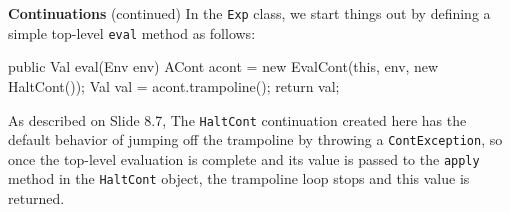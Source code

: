 \begin{minipage}[t]{\sw}
\slidenumber
\LARGE
{\bf Continuations} (continued)\exx
In the \verb'Exp' class,
we start things out by defining
a simple top-level \verb'eval' method as follows:
\Large
\begin{qv}
public Val eval(Env env) {
    ACont acont = new EvalCont(this, env, new HaltCont());
    Val val = acont.trampoline();
    return val;
}
\end{qv}
\LARGE
As described on Slide 8.7,
The \verb'HaltCont' continuation created here has the default behavior
of jumping off the trampoline
by throwing a \verb'ContException',
so once the top-level evaluation is complete
and its value is passed to the \verb'apply' method
in the \verb'HaltCont' object,
the trampoline loop stops
and this value is returned.
\end{minipage}
